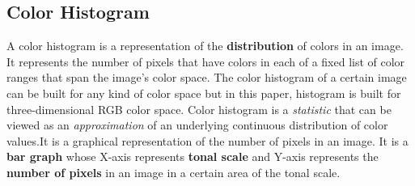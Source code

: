 \documentclass[pstricks,10pt,notitlepage]{report}
\begin{document}
\subsection{Color Histogram}
A color histogram is a representation of the \textbf{distribution} of colors in an image\cite{n1}. It represents the number of pixels that have colors in each of a fixed list of color ranges that span the image’s color space. The color histogram of a certain image can be built for any kind of color space but in this paper, histogram is built for three-dimensional RGB color space. Color histogram is a \textit{statistic} that can be viewed as an \textit{approximation} of an underlying continuous distribution of color values.It is a graphical representation of the number of pixels in an image. It is a \textbf{bar graph} whose X-axis represents \textbf{tonal scale} and Y-axis represents the \textbf{number of pixels} in an image in a certain area of the tonal scale.\\
\end{document}
